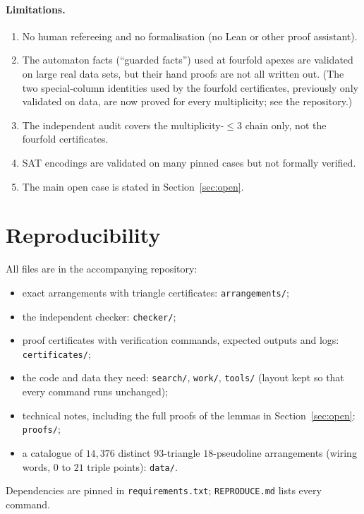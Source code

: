 \documentclass[11pt]{article}
\theoremstyle{definition}
\theoremstyle{remark}
\begin{document}
\paragraph{Limitations.}
\begin{enumerate}[nosep]
\item No human refereeing and no formalisation (no Lean or other proof assistant).
\item The automaton facts (``guarded facts'') used at fourfold apexes are validated on large real data sets, but their
hand proofs are not all written out. (The two special-column identities used by the fourfold certificates, previously
only validated on data, are now proved for every multiplicity; see the repository.)
\item The independent audit covers the multiplicity-$\le 3$ chain only, not the fourfold certificates.
\item SAT encodings are validated on many pinned cases but not formally verified.
\item The main open case is stated in Section~\ref{sec:open}.
\end{enumerate}

\section{Reproducibility}
All files are in the accompanying repository:
\begin{itemize}[nosep]
\item exact arrangements with triangle certificates: \texttt{arrangements/};
\item the independent checker: \texttt{checker/};
\item proof certificates with verification commands, expected outputs and logs: \texttt{certificates/};
\item the code and data they need: \texttt{search/}, \texttt{work/}, \texttt{tools/} (layout kept so that every
command runs unchanged);
\item technical notes, including the full proofs of the lemmas in Section~\ref{sec:open}: \texttt{proofs/};
\item a catalogue of $14{,}376$ distinct $93$-triangle $18$-pseudoline arrangements (wiring words, $0$ to $21$ triple
points): \texttt{data/}.
\end{itemize}
Dependencies are pinned in \texttt{requirements.txt}; \texttt{REPRODUCE.md} lists every command.
\end{document}
